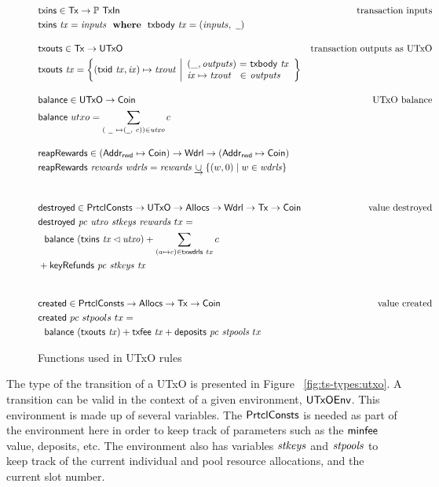 \documentclass[11pt,a4paper,dvipsnames]{article}
\newcommand{\Tx}{\type{Tx}}
\newcommand{\UTxO}{\type{UTxO}}
\newcommand{\Wdrl}{\type{Wdrl}}
\newcommand{\Coin}{\type{Coin}}
\newcommand{\PrtclConsts}{\type{PrtclConsts}}
\newcommand{\Allocs}{\type{Allocs}}
\newcommand{\AddrRWD}{\type{Addr_{rwd}}}
\newcommand{\TxIn}{\type{TxIn}}
\newcommand{\UTxOEnv}{\type{UTxOEnv}}
\newcommand{\txins}[1]{\fun{txins}~ \var{#1}}
\newcommand{\txouts}[1]{\fun{txouts}~ \var{#1}}
\newcommand{\balance}[1]{\fun{balance}~ \var{#1}}
\newcommand{\deposits}[2]{\fun{deposits}~ \var{#1} ~ \var{#2}}
\newcommand{\keyRefunds}[3]{\fun{keyRefunds}~ \var{#1}~ \var{#2}~ \var{#3}}
\newcommand{\destroyed}[4]{\fun{destroyed}~ \var{#1}~ \var{#2}~ \var{#3}~ \var{#4}}
\newcommand{\txbody}[1]{\fun{txbody}~ \var{#1}}
\newcommand{\txfee}[1]{\fun{txfee}~ \var{#1}}
\newcommand{\wcard}[0]{\underline{\phantom{a}}}
\theoremstyle{definition}
\theoremstyle{definition}
\begin{document}
\begin{figure}
  \begin{align*}
    & \fun{txins} \in \Tx \to \powerset{\TxIn}
    & \text{transaction inputs} \\
    & \txins{tx} = \var{inputs} \where \txbody{tx} = (\var{inputs}, ~\wcard)
    \nextdef
    & \fun{txouts} \in \Tx \to \UTxO
    & \text{transaction outputs as UTxO} \\
    & \fun{txouts} ~ \var{tx} =
      \left\{ (\fun{txid} ~ \var{tx}, \var{ix}) \mapsto \var{txout} ~
      \middle| \begin{array}{l@{~}c@{~}l}
                 (\_, \var{outputs}) & = & \txbody{tx} \\
                 \var{ix} \mapsto \var{txout} & \in & \var{outputs}
               \end{array}
      \right\}
    \nextdef
    & \fun{balance} \in \UTxO \to \Coin
    & \text{UTxO balance} \\
    & \fun{balance} ~ utxo = \sum_{(~\wcard ~ \mapsto (\wcard, ~c)) \in \var{utxo}} c
    \nextdef
    & \fun{reapRewards} \in (\AddrRWD \mapsto \Coin) \to \Wdrl \to (\AddrRWD \mapsto \Coin) \\
        & \fun{reapRewards}~\var{rewards}~\var{wdrls} =
         \var{rewards} \unionoverrideRight \{(w, 0) \mid w \in \var{wdrls}\} \\
    \nextdef
    & \fun{destroyed} \in \PrtclConsts \to \UTxO \to \Allocs \to \Wdrl \to \Tx \to \Coin
    & \text{value destroyed} \\
    & \destroyed{pc}{utxo}{stkeys}{rewards}~{tx} = \\
    & ~~\balance{(\txins{tx} \restrictdom \var{utxo})} +
        \sum_{(a \mapsto c) \in \fun{txwdrls}~{tx}} c  \\
        & + \keyRefunds{pc}{stkeys}{tx} \\
    \nextdef
    & \fun{created} \in \PrtclConsts \to \Allocs \to \Tx \to \Coin
    & \text{value created} \\
    & \fun{created} ~ pc ~ stpools ~ tx = \\
    &~~\balance{(\txouts{tx})}
     + \txfee{tx} + \deposits{pc}{stpools}~{tx}\\
  \end{align*}

  \caption{Functions used in UTxO rules}
  \label{fig:derived-defs:utxo}
\end{figure}


The type of the transition of a UTxO is presented in Figure
~\ref{fig:ts-types:utxo}. A
transition can be valid in the context of a given environment, $\UTxOEnv$.
This environment is made up of several variables.
The $\PrtclConsts$ is needed as part of the environment here in order to
keep track of parameters such as the $\mathsf{minfee}$ value, deposits, etc.
The environment also has variables $\mathit{stkeys}$ and $\mathit{stpools}$
to keep track of the current individual and pool resource allocations,
and the current slot number.
\end{document}
